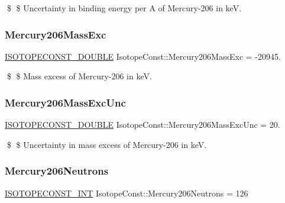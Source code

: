 \$ \$ Uncertainty in binding energy per A of Mercury-\/206 in keV. \mbox{\label{group___isotope_const-_mercury-_hg206_ga03edf37455200544842aea048672ac0e}} 
\subsubsection{\texorpdfstring{Mercury206\+Mass\+Exc}{Mercury206MassExc}}
{\footnotesize\ttfamily \mbox{\hyperlink{group___isotope_const-_macros_ga8f45a7272ce02c0b4c65c44636ed719a}{I\+S\+O\+T\+O\+P\+E\+C\+O\+N\+S\+T\+\_\+\+D\+O\+U\+B\+LE}} Isotope\+Const\+::\+Mercury206\+Mass\+Exc = -\/20945.}

\$ \$ Mass excess of Mercury-\/206 in keV. \mbox{\label{group___isotope_const-_mercury-_hg206_ga49f7582850a700a3a04468973c9c4239}} 
\subsubsection{\texorpdfstring{Mercury206\+Mass\+Exc\+Unc}{Mercury206MassExcUnc}}
{\footnotesize\ttfamily \mbox{\hyperlink{group___isotope_const-_macros_ga8f45a7272ce02c0b4c65c44636ed719a}{I\+S\+O\+T\+O\+P\+E\+C\+O\+N\+S\+T\+\_\+\+D\+O\+U\+B\+LE}} Isotope\+Const\+::\+Mercury206\+Mass\+Exc\+Unc = 20.}

\$ \$ Uncertainty in mass excess of Mercury-\/206 in keV. \mbox{\label{group___isotope_const-_mercury-_hg206_ga06ab3f5c22b5eb983eb99e915cfc7089}} 
\subsubsection{\texorpdfstring{Mercury206\+Neutrons}{Mercury206Neutrons}}
{\footnotesize\ttfamily \mbox{\hyperlink{group___isotope_const-_macros_ga5f18360b3e99483a35c32d789e62621c}{I\+S\+O\+T\+O\+P\+E\+C\+O\+N\+S\+T\+\_\+\+I\+NT}} Isotope\+Const\+::\+Mercury206\+Neutrons = 126}

